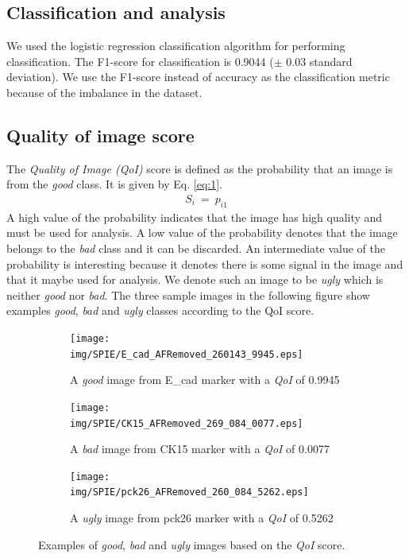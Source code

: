 \subsection{Classification and analysis}
We used the logistic regression classification algorithm for performing classification. The F1-score for classification is 0.9044 ($\pm$  0.03 standard deviation). We use the F1-score instead of accuracy as the classification metric because of the imbalance in the dataset.

\subsection{Quality of image score}
The \textit{Quality of Image (QoI)} score is defined as the probability that an image is from the \textit{good} class. It is given by Eq. \ref{eq:1}.
\begin{equation}
\begin{gathered} 
S_i \ =  \ p_{i1} 
\end{gathered}
\label{eq:1}
\end{equation}
A high value of the probability indicates that the image has high quality and must be used for analysis. A low value of the probability denotes that the image belongs to the \textit{bad} class and it can be discarded. An intermediate value of the probability is interesting because it denotes there is some signal in the image and that it maybe used for analysis. We denote such an image to be \textit{ugly} which is neither \textit{good} nor \textit{bad}.
 The three sample images in the following figure show examples \textit{good}, \textit{bad} and \textit{ugly} classes according to the QoI score. 

\begin{figure} [ht!]
    \centering
    \begin{subfigure}[b]{0.3\textwidth}
        \centering
        \texttt{[image: img/SPIE/E\_cad\_AFRemoved\_260143\_9945.eps]}
        \caption{A \textit{good} image from E\_cad marker with a \textit{QoI} of 0.9945}
        \label{fig:ecad_example}
    \end{subfigure}
    \hfill
    \begin{subfigure}[b]{0.3\textwidth}
        \centering
        \texttt{[image: img/SPIE/CK15\_AFRemoved\_269\_084\_0077.eps]}
        \caption{A \textit{bad} image from CK15 marker with a \textit{QoI} of 0.0077}
        \label{fig:pck26_example}
    \end{subfigure}
    \hfill
    \begin{subfigure}[b]{0.3\textwidth}
        \centering
        \texttt{[image: img/SPIE/pck26\_AFRemoved\_260\_084\_5262.eps]}
        \caption{A \textit{ugly} image from pck26 marker with a \textit{QoI} of 0.5262}
        \label{fig:CK15_example}
    \end{subfigure}
    \caption{Examples of \textit{good}, \textit{bad} and \textit{ugly} images based on the \textit{QoI} score.}
    \label{fig:example_images}
\end{figure}



